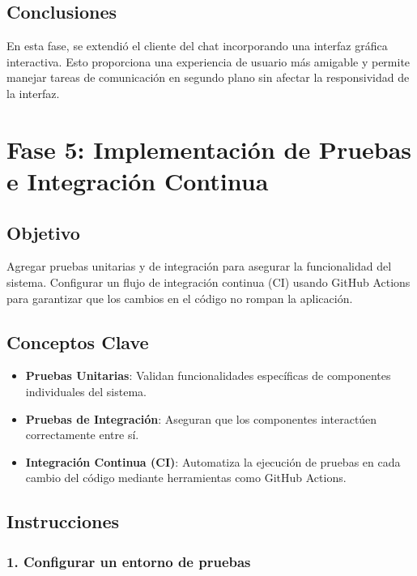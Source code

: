 \documentclass[
  a4paper,
  DIV=11,
  numbers=noendperiod,
  onepage,
  openany]{scrreprt}
\providecommand{\tightlist}{%
  \setlength{\itemsep}{0pt}\setlength{\parskip}{0pt}}\usepackage{longtable,booktabs,array}
\begin{document}
\section{Conclusiones}\label{conclusiones-17}

En esta fase, se extendió el cliente del chat incorporando una interfaz
gráfica interactiva. Esto proporciona una experiencia de usuario más
amigable y permite manejar tareas de comunicación en segundo plano sin
afectar la responsividad de la interfaz.

\chapter{Fase 5: Implementación de Pruebas e Integración
Continua}\label{fase-5-implementaciuxf3n-de-pruebas-e-integraciuxf3n-continua}

\section{Objetivo}\label{objetivo-5}

Agregar pruebas unitarias y de integración para asegurar la
funcionalidad del sistema. Configurar un flujo de integración continua
(CI) usando GitHub Actions para garantizar que los cambios en el código
no rompan la aplicación.

\section{Conceptos Clave}\label{conceptos-clave-19}

\begin{itemize}
\tightlist
\item
  \textbf{Pruebas Unitarias}: Validan funcionalidades específicas de
  componentes individuales del sistema.
\item
  \textbf{Pruebas de Integración}: Aseguran que los componentes
  interactúen correctamente entre sí.
\item
  \textbf{Integración Continua (CI)}: Automatiza la ejecución de pruebas
  en cada cambio del código mediante herramientas como GitHub Actions.
\end{itemize}

\section{Instrucciones}\label{instrucciones-15}

\subsection{1. Configurar un entorno de
pruebas}\label{configurar-un-entorno-de-pruebas}
\end{document}
